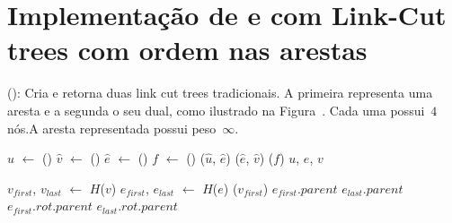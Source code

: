 \section{Implementação de \LCOSplice{} e \LCOMakeEdge{} com Link-Cut trees com ordem nas arestas}
\LCOMakeEdge(): Cria e retorna duas link cut trees tradicionais. A primeira representa uma aresta e a segunda o seu dual, como ilustrado na Figura~. Cada uma possui~$4$ nós.A aresta representada possui peso~$\infty$.




\begin{algorithm}[htb]
\caption{\LCOMakeEdge()}
\label{Algo:LCOMakeEdge}
\begin{algorithmic}[1]
\State $\hat u$ $\gets$ \LCOMakeNode()
\State $\hat v$ $\gets$ \LCOMakeNode()
\State $\hat e$ $\gets$ \LCOMakeNode()
\State $f$ $\gets$ \LCOMakeNode()
\State \LCOLink($\hat u$, $\hat e$)
\State \LCOLink($\hat e$, $\hat v$)
\State \LCOLoop($f$)
\State \Return $u$, $e$, $v$ 
\end{algorithmic}
\end{algorithm}

\begin{algorithm}[htb]
\caption{\LCOFindSubNode($v$, $e$)}
\label{Algo:LCOFindSubNode}
\begin{algorithmic}[1]
\State $v_{first}$, $v_{last}$ $\gets$ $H$($v$)
\State $e_{first}$, $e_{last}$ $\gets$ $H$($e$)
\State \linkcutEvert($v_{first}$)
\State \Return $e_{first}$.$parent$
\EndIf
\State \Return $e_{last}$.$parent$
\Else
{}
\State \Return $e_{first}.rot.parent$
\Else
\State \Return $e_{last}.rot.parent$
\EndIf
\EndIf
\end{algorithmic}
\end{algorithm}

